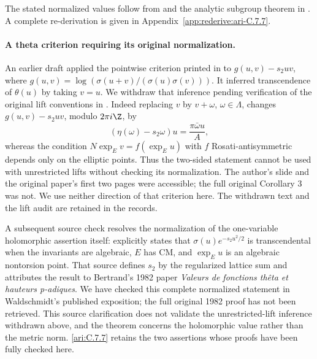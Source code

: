 

The stated normalized values follow from \citet[Theorem~1 and Corollary~1]{waldschmidt1979sigma} and the analytic subgroup theorem in \citet[Theorem~6.1]{huber2022}. A complete re-derivation is given in Appendix~\ref{app:rederive:ari-C.7.7}.


\paragraph{A theta criterion requiring its original normalization.}
An earlier draft applied the pointwise criterion printed in
\citet[final slide, comment (c)]{bertrand2017} to
$g(u,v)-s_2uv$, where
$g(u,v)=\log(\sigma(u+v)/(\sigma(u)\sigma(v)))$.
It inferred transcendence of $\theta(u)$ by taking $v=u$.
We withdraw that inference pending verification of the original
lift conventions in \citet[Corollary 3]{bertrand1984}.
Indeed replacing $v$ by $v+\omega$, $\omega\in\Lambda$,
changes $g(u,v)-s_2uv$, modulo $2\pi i\Z$, by
\[
 (\eta(\omega)-s_2\omega)u=\frac{\pi\bar\omega u}{A},
\]
whereas the condition $N\exp_Ev=f(\exp_Eu)$ with $f$
Rosati-antisymmetric depends only on the elliptic points.
Thus the two-sided statement cannot be used with unrestricted
lifts without checking its normalization. The author's slide
and the original paper's first two pages were accessible;
the full original Corollary 3 was not. We use neither direction
of that criterion here. The withdrawn text and the lift audit
are retained in the records.

A subsequent source check resolves the normalization of the
one-variable holomorphic assertion itself:
\citet[p.~15-03]{waldschmidt1988theta} explicitly states that
$\sigma(u)e^{-s_2u^2/2}$ is transcendental when the invariants
are algebraic, $E$ has CM, and $\exp_Eu$ is an algebraic
nontorsion point.  That source defines $s_2$ by the regularized
lattice sum and attributes the result to Bertrand's 1982
paper \emph{Valeurs de fonctions th\^eta et hauteurs p-adiques}.
We have checked this complete normalized statement in
Waldschmidt's published exposition; the full original 1982
proof has not been retrieved.  This source clarification
does not validate the unrestricted-lift inference withdrawn
above, and the theorem concerns the holomorphic value rather
than the metric norm.  \ref{ari:C.7.7} retains the two assertions whose
proofs have been fully checked here.

